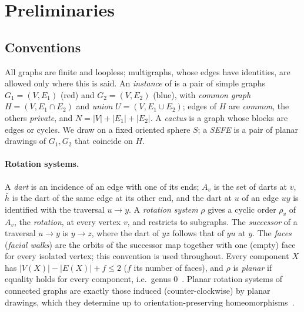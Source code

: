 \section{Preliminaries}\label{sec:v4-prelim}

\subsection{Conventions}\label{sec:v4-conv}

All graphs are finite and loopless; multigraphs, whose edges have
identities, are allowed only where this is said. An \emph{instance} of \sefe{} is a pair of simple graphs
$G_1=(V,E_1)$ (red) and $G_2=(V,E_2)$ (blue), with \emph{common graph}
$H=(V,E_1\cap E_2)$ and \emph{union} $U=(V,E_1\cup E_2)$; edges of $H$ are
\emph{common}, the others \emph{private}, and $N=|V|+|E_1|+|E_2|$. A
\emph{cactus} is a graph whose blocks are edges or cycles. We draw on a fixed
oriented sphere $S$; a \emph{SEFE} is a pair of planar drawings of $G_1,G_2$
that coincide on $H$.

\paragraph{Rotation systems.}
A \emph{dart} is an incidence of an edge with one of its ends; $A_v$ is the
set of darts at $v$, $\bar h$ is the dart of the same edge at its other end,
and the dart at $u$ of an edge $uy$ is identified with the traversal
$u\to y$. A \emph{rotation system} $\rho$ gives a cyclic order $\rho_v$ of
$A_v$, the \emph{rotation}, at every vertex $v$, and restricts to subgraphs.
The \emph{successor} of a traversal $u\to y$ is $y\to z$, where the dart of
$yz$ follows that of $yu$ at $y$. The \emph{faces} (\emph{facial walks}) are
the orbits of the successor map together with one (empty) face for every
isolated vertex; this convention is used throughout. Every component $X$ has
$|V(X)|-|E(X)|+f\le2$ ($f$ its number of faces), and $\rho$ is
\emph{planar} if equality holds for every component, i.e.\ genus
$0$~\cite[Chapter~3]{MT01}. Planar rotation systems of connected
graphs are exactly those induced (counter-clockwise) by planar drawings,
which they determine up to orientation-preserving
homeomorphisms~\cite[Chapter~3]{MT01}.

